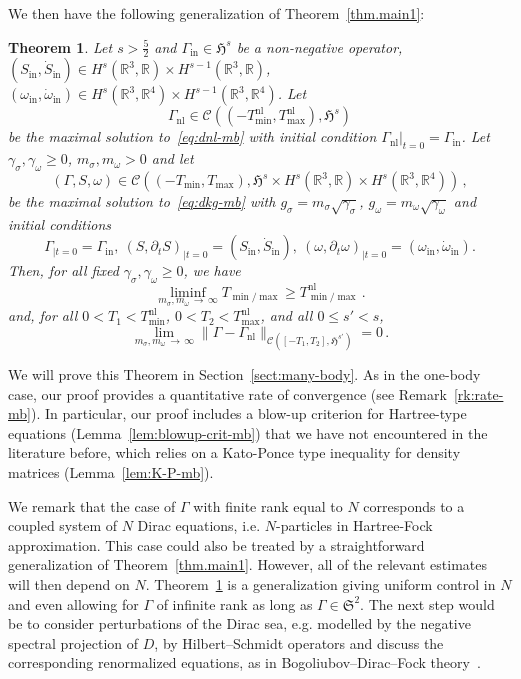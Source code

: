 \documentclass[10pt]{amsart}
\newtheorem{theo}{Theorem}[section]
\theoremstyle{definition}\newtheorem{defi}[theo]{Definition}\newtheorem{rema}[theo]{Remark}\newtheorem{exam}[theo]{Example}\newtheorem{exem}[theo]{Example}\newtheorem{nota}[theo]{Notation}
\newcommand{\rmin}{\mathrm{in}}
\newcommand{\nl}{\mathrm{nl}}
\newcommand{\cC}{\mathcal{C}}
\newcommand\R{\mathbb{R}}
\newcommand{\gS}{\mathfrak{S}}
\newcommand{\gH}{\mathfrak{H}}
\begin{document}
We then have the following generalization of Theorem~\ref{thm.main1}:


\begin{theo}\label{thm.main-mb}
Let $s>\tfrac52$ and $\Gamma_\rmin\in \gH^s$ be a non-negative operator, $(S_\rmin,\dot{S}_\rmin)\in H^s(\R^3, \R)\times H^{s-1}(\R^3, \R)$, $(\omega_\rmin,\dot{\omega}_\rmin)\in H^s(\R^3, \R^4)\times H^{s-1}(\R^3, \R^4)$. Let
\begin{equation*}
\Gamma_\nl\in\cC\left(\left(-T_{\min}^{\nl}, T_{\max}^{\nl}\right),\gH^s\right)
\end{equation*}
be the maximal solution to~\eqref{eq:dnl-mb} with initial condition $\Gamma_\nl\vert_{t=0}=\Gamma_\rmin$. Let $\gamma_\sigma, \gamma_\omega \geq 0$, $m_\sigma, m_\omega>0$ and let
\[
(\Gamma,S,\omega)\in \cC\left((-T_{\min}, T_{\max}),\gH^s\times H^s\left(\R^3,\R\right)\times H^s\left(\R^3, \R^4\right)\right)\,,
\]
be the maximal solution to~\eqref{eq:dkg-mb} with $g_\sigma=m_\sigma\sqrt{\gamma_\sigma}$, $g_\omega=m_\omega\sqrt{\gamma_\omega}$ and initial conditions
\begin{equation*}
\Gamma_{|t=0}=\Gamma_\rmin,\ (S,\partial_t S)_{|t=0}= (S_\rmin,\dot{S}_\rmin), \ (\omega,\partial_t \omega)_{|t=0}= (\omega_\rmin,\dot{\omega}_\rmin).
\end{equation*}
Then, for all fixed $\gamma_\sigma, \gamma_\omega \geq 0$, we have
\[
\liminf_{m_\sigma, m_\omega\,\to\,\infty}T_{\min/\max}\geq T_{\min/\max}^{\nl}\,.
\]
and, for all $0<T_1<T_{\min}^{\nl}$, $0<T_2<T_{\max}^{\nl}$, and all $0\leq s'<s$,
\[
\lim_{m_\sigma, m_\omega\,\to\,\infty}\|\Gamma-\Gamma_{\nl}\|_{\cC\left([-T_1, T_2],\gH^{s'}\right)}=0\,.
\]
\end{theo}


We will prove this Theorem in Section~\ref{sect:many-body}. As in the one-body case, our proof provides a quantitative rate of convergence (see Remark~\ref{rk:rate-mb}). In particular, our proof includes a blow-up criterion for Hartree-type equations (Lemma~\ref{lem:blowup-crit-mb}) that we have not encountered in the literature before, which relies on a Kato-Ponce type inequality for density matrices (Lemma~\ref{lem:K-P-mb}).

We remark that the case of $\Gamma$ with finite rank equal to $N$ corresponds to a coupled system of $N$ Dirac equations, i.e. $N$-particles in Hartree-Fock approximation. This case could also be treated by a straightforward generalization of Theorem~\ref{thm.main1}. However, all of the relevant estimates will then depend on $N$. Theorem~\ref{thm.main-mb} is a generalization giving uniform control in $N$ and even allowing for $\Gamma$ of infinite rank as long as $\Gamma \in \gS^2$. The next step would be to consider perturbations of the Dirac sea, e.g. modelled by the negative spectral projection of $D$, by Hilbert--Schmidt operators and discuss the corresponding renormalized equations, as in Bogoliubov--Dirac--Fock theory~\cite{chaix1989, GraHaiLewSer-13,hainzl2005, hainzl2007}.
\end{document}
